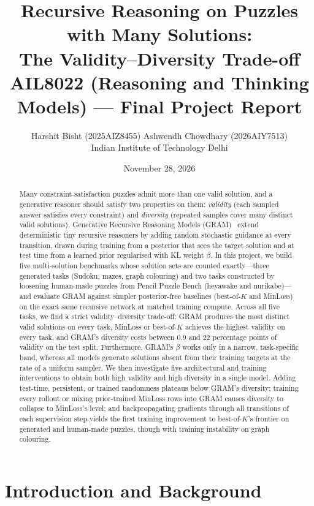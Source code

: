 \documentclass[11pt]{article}
\title{\textbf{Recursive Reasoning on Puzzles with Many Solutions:\\The Validity--Diversity Trade-off}\\[6pt]
\large AIL8022 (Reasoning and Thinking Models) --- Final Project Report}
\author{Harshit Bisht (2025AIZ8455) \quad Ashwendh Chowdhary (2026AIY7513)\\[2pt]
\small Indian Institute of Technology Delhi}
\date{November 28, 2026}
\newcommand{\bok}{best-of-$K$}
\begin{document}
\maketitle

\begin{abstract}
Many constraint-satisfaction puzzles admit more than one valid solution, and a generative reasoner should satisfy two properties on them: \emph{validity} (each sampled answer satisfies every constraint) and \emph{diversity} (repeated samples cover many distinct valid solutions). Generative Recursive Reasoning Models (GRAM)~\cite{baek2026} extend deterministic tiny recursive reasoners by adding random stochastic guidance at every transition, drawn during training from a posterior that sees the target solution and at test time from a learned prior regularised with KL weight $\beta$. In this project, we build five multi-solution benchmarks whose solution sets are counted exactly---three generated tasks (Sudoku, mazes, graph colouring) and two tasks constructed by loosening human-made puzzles from Pencil Puzzle Bench (heyawake and nurikabe)---and evaluate GRAM against simpler posterior-free baselines (\bok{} and MinLoss) on the exact same recursive network at matched training compute. Across all five tasks, we find a strict validity--diversity trade-off: GRAM produces the most distinct valid solutions on every task, MinLoss or \bok{} achieves the highest validity on every task, and GRAM's diversity costs between 0.9 and 22 percentage points of validity on the test split. Furthermore, GRAM's $\beta$ works only in a narrow, task-specific band, whereas all models generate solutions absent from their training targets at the rate of a uniform sampler. We then investigate five architectural and training interventions to obtain both high validity and high diversity in a single model. Adding test-time, persistent, or trained randomness plateaus below GRAM's diversity; training every rollout or mixing prior-trained MinLoss rows into GRAM causes diversity to collapse to MinLoss's level; and backpropagating gradients through all transitions of each supervision step yields the first training improvement to \bok{}'s frontier on generated and human-made puzzles, though with training instability on graph colouring.
\end{abstract}

\tableofcontents
\newpage

\section{Introduction and Background}
\label{sec:intro}
\end{document}
